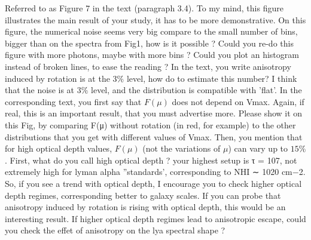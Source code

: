 \documentclass[12pt]{article}
\begin{document}
Referred to as Figure 7 in the text (paragraph 3.4). To my mind, this figure illustrates the main result of your study, it has to be more demonstrative. On this figure, the numerical noise seems very big compare to the small number of bins, bigger than on the spectra from Fig1, how is it possible ? Could you re-do this figure with more photons, maybe with more bins ? Could you plot an histogram instead of broken lines, to ease the reading ? In the text, you write anisotropy induced by rotation is at the 3$\%$ level, how do to estimate this number? I think that the noise is at $3\%$ level, and the distribution is compatible with ’flat’. In the corresponding text, you first say that $F(\mu)$ does not depend on Vmax. Again, if real, this is an important result, that you must advertise more. Please show it on this Fig, by comparing F(μ) without rotation (in red, for example) to the other distributions that you get with different values of Vmax. Then, you mention that for high optical depth values, $F(\mu)$ (not the variations of $\mu$) can vary up to $15\%$. First, what do you call high optical depth ? your highest setup is τ = 107, not extremely high for lyman alpha ”standards’, corresponding to NHI ∼ 1020 cm−2. So, if you see a trend with optical depth, I encourage you to check higher optical depth regimes, corresponding better to galaxy scales. If you can probe that anisotropy induced by rotation is rising with optical depth, this would be an interesting result.
If higher optical depth regimes lead to anisotropic escape, could you check the effet of anisotropy on the lya spectral shape ?
\end{document}
